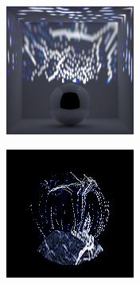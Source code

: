 \begin{figure}[]
\begin{subfigure}{\textwidth}
\begin{subfigure}{0.19\textwidth}
            \centering
            \includegraphics[width=\textwidth]{images/04-experiment03/ball_dof/marble/stats_proj.jpg}
            \caption*{}
        \end{subfigure}
        \hfill
        \begin{subfigure}{0.19\textwidth}
            \centering
            \includegraphics[width=\textwidth]{images/04-experiment03/ball_dof/marble/pixel_im.jpg}

\end{subfigure}
\end{subfigure}
\end{figure}
